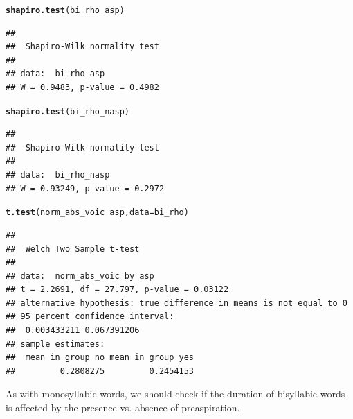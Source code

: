 \documentclass[a4paper,11pt]{article}\usepackage[]{graphicx}\usepackage[]{color}
\makeatletter
\newcommand{\hlopt}[1]{\textcolor[rgb]{0,0,0}{#1}}%
\newcommand{\hlstd}[1]{\textcolor[rgb]{0.345,0.345,0.345}{#1}}%
\newcommand{\hlkwc}[1]{\textcolor[rgb]{0.333,0.667,0.333}{#1}}%
\newcommand{\hlkwd}[1]{\textcolor[rgb]{0.737,0.353,0.396}{\textbf{#1}}}%
\newenvironment{kframe}{%
 \def\at@end@of@kframe{}%
 \ifinner\ifhmode%
  \def\at@end@of@kframe{\end{minipage}}%
  \begin{minipage}{\columnwidth}%
 \fi\fi%
 \def\FrameCommand##1{\hskip\@totalleftmargin \hskip-\fboxsep
 \colorbox{shadecolor}{##1}\hskip-\fboxsep
     \hskip-\linewidth \hskip-\@totalleftmargin \hskip\columnwidth}%
 \MakeFramed {\advance\hsize-\width
   \@totalleftmargin\z@ \linewidth\hsize
   \@setminipage}}%
 {\par\unskip\endMakeFramed%
 \at@end@of@kframe}
\newenvironment{knitrout}{}{} %
\makeatother
\begin{document}
\begin{knitrout}
\color{fgcolor}\begin{kframe}
\begin{alltt}
\hlkwd{shapiro.test}\hlstd{(bi_rho_asp)}
\end{alltt}
\begin{verbatim}
## 
## 	Shapiro-Wilk normality test
## 
## data:  bi_rho_asp
## W = 0.9483, p-value = 0.4982
\end{verbatim}
\begin{alltt}
\hlkwd{shapiro.test}\hlstd{(bi_rho_nasp)}
\end{alltt}
\begin{verbatim}
## 
## 	Shapiro-Wilk normality test
## 
## data:  bi_rho_nasp
## W = 0.93249, p-value = 0.2972
\end{verbatim}
\begin{alltt}
\hlkwd{t.test}\hlstd{(norm_abs_voic} \hlopt{~} \hlstd{asp,} \hlkwc{data} \hlstd{= bi_rho)}
\end{alltt}
\begin{verbatim}
## 
## 	Welch Two Sample t-test
## 
## data:  norm_abs_voic by asp
## t = 2.2691, df = 27.797, p-value = 0.03122
## alternative hypothesis: true difference in means is not equal to 0
## 95 percent confidence interval:
##  0.003433211 0.067391206
## sample estimates:
##  mean in group no mean in group yes 
##         0.2808275         0.2454153
\end{verbatim}
\end{kframe}
\end{knitrout}

As with monosyllabic words, we should check if the duration of bisyllabic words is affected by the presence vs. absence of preaspiration.
\end{document}
